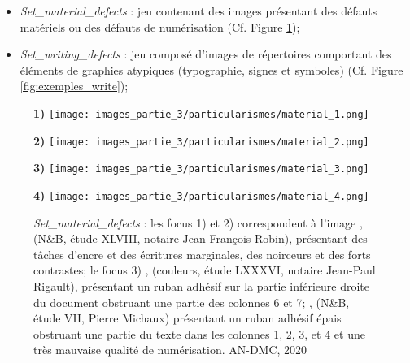 \begin{itemize}
    \item \textit{Set\_material\_defects} : jeu contenant des images présentant des défauts matériels ou des défauts de numérisation (Cf. Figure \ref{fig:exemples_material});
    \item \textit{Set\_writing\_defects} : jeu composé d'images de répertoires comportant des éléments de graphies atypiques (typographie, signes et symboles) (Cf. Figure \ref{fig:exemples_write});
\end{itemize}
\newpage
\begin{figure}[H]
    \begin{minipage}[c]{.46\linewidth} 
        \centering
        \textbf{1)}
        \texttt{[image: images\_partie\_3/particularismes/material\_1.png]}
        \end{minipage}
    \hfill%
    \begin{minipage}[c]{.46\linewidth}
        \centering
        \textbf{2)}
        \texttt{[image: images\_partie\_3/particularismes/material\_2.png]}
    \end{minipage}
    \hfill%
    \begin{minipage}[c]{.46\linewidth}
        \centering
        \textbf{3)}
        \texttt{[image: images\_partie\_3/particularismes/material\_3.png]}
    \end{minipage}
    \hfill%
    \begin{minipage}[c]{.46\linewidth}
        \centering
        \textbf{4)}
        \texttt{[image: images\_partie\_3/particularismes/material\_4.png]}
    \end{minipage}
        \caption{\textit{Set\_material\_defects} : les focus 1) et 2) correspondent à l'image , (N\&B, étude XLVIII, notaire Jean-François Robin), présentant des tâches d'encre et des écritures marginales, des noirceurs et des forts contrastes; le focus 3) 
        , (couleurs, étude LXXXVI, notaire Jean-Paul Rigault), 
        présentant un ruban adhésif sur la partie inférieure droite du document obstruant une partie des colonnes 6 et 7;
        , (N\&B, étude VII, Pierre Michaux) présentant un ruban adhésif épais obstruant une partie du texte dans les colonnes 1, 2, 3, et 4 et une très mauvaise qualité de numérisation.
        \textcopyright AN-DMC, 2020}
    \label{fig:exemples_material}
\end{figure}

